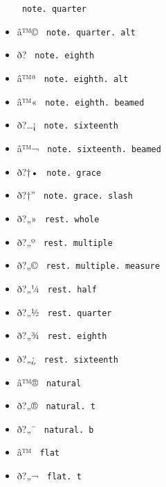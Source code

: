 \begin{itemize}
{  \texttt{\ note.\ quarter\ }}
\item
  \label{symbol-note.quarter.alt}{{ â™© }
  \texttt{\ note.\ quarter.\ alt\ }}
\item
  \label{symbol-note.eighth}{{ ð? }
  \texttt{\ note.\ eighth\ }}
\item
  \label{symbol-note.eighth.alt}{{ â™ª }
  \texttt{\ note.\ eighth.\ alt\ }}
\item
  \label{symbol-note.eighth.beamed}{{ â™« }
  \texttt{\ note.\ eighth.\ beamed\ }}
\item
  \label{symbol-note.sixteenth}{{ ð?\ldots¡ }
  \texttt{\ note.\ sixteenth\ }}
\item
  \label{symbol-note.sixteenth.beamed}{{ â™¬ }
  \texttt{\ note.\ sixteenth.\ beamed\ }}
\item
  \label{symbol-note.grace}{{ ð?†• }
  \texttt{\ note.\ grace\ }}
\item
  \label{symbol-note.grace.slash}{{ ð?†'' }
  \texttt{\ note.\ grace.\ slash\ }}
\item
  \label{symbol-rest.whole}{{ ð?„» }
  \texttt{\ rest.\ whole\ }}
\item
  \label{symbol-rest.multiple}{{ ð?„º }
  \texttt{\ rest.\ multiple\ }}
\item
  \label{symbol-rest.multiple.measure}{{ ð?„© }
  \texttt{\ rest.\ multiple.\ measure\ }}
\item
  \label{symbol-rest.half}{{ ð?„¼ }
  \texttt{\ rest.\ half\ }}
\item
  \label{symbol-rest.quarter}{{ ð?„½ }
  \texttt{\ rest.\ quarter\ }}
\item
  \label{symbol-rest.eighth}{{ ð?„¾ }
  \texttt{\ rest.\ eighth\ }}
\item
  \label{symbol-rest.sixteenth}{{ ð?„¿ }
  \texttt{\ rest.\ sixteenth\ }}
\item
  \label{symbol-natural}{{ â™® } \texttt{\ natural\ }}
\item
  \label{symbol-natural.t}{{ ð?„® }
  \texttt{\ natural.\ t\ }}
\item
  \label{symbol-natural.b}{{ ð?„¯ }
  \texttt{\ natural.\ b\ }}
\item
  \label{symbol-flat}{{ â™­ } \texttt{\ flat\ }}
\item
  \label{symbol-flat.t}{{ ð?„¬ } \texttt{\ flat.\ t\ }}

\end{itemize}
